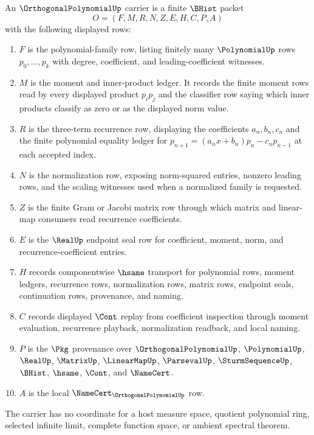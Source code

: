 \begin{definition}
\label{def:orthogonal-polynomial-carrier}
An $\OrthogonalPolynomialUp$ carrier is a finite $\BHist$ packet
$$
O=(F,M,R,N,Z,E,H,C,P,A)
$$
with the following displayed rows:
\begin{enumerate}
\item $F$ is the polynomial-family row, listing finitely many $\PolynomialUp$ rows $p_0,\ldots,p_k$ with degree, coefficient, and leading-coefficient witnesses.
\item $M$ is the moment and inner-product ledger. It records the finite moment rows read by every displayed product $p_i p_j$ and the classifier row saying which inner products classify as zero or as the displayed norm value.
\item $R$ is the three-term recurrence row, displaying the coefficients $a_n,b_n,c_n$ and the finite polynomial equality ledger for $p_{n+1}=(a_n x+b_n)p_n-c_n p_{n-1}$ at each accepted index.
\item $N$ is the normalization row, exposing norm-squared entries, nonzero leading rows, and the scaling witnesses used when a normalized family is requested.
\item $Z$ is the finite Gram or Jacobi matrix row through which matrix and linear-map consumers read recurrence coefficients.
\item $E$ is the $\RealUp$ endpoint seal row for coefficient, moment, norm, and recurrence-coefficient entries.
\item $H$ records componentwise $\hsame$ transport for polynomial rows, moment ledgers, recurrence rows, normalization rows, matrix rows, endpoint seals, continuation rows, provenance, and naming.
\item $C$ records displayed $\Cont$ replay from coefficient inspection through moment evaluation, recurrence playback, normalization readback, and local naming.
\item $P$ is the $\Pkg$ provenance over $\OrthogonalPolynomialUp$, $\PolynomialUp$, $\RealUp$, $\MatrixUp$, $\LinearMapUp$, $\ParsevalUp$, $\SturmSequenceUp$, $\BHist$, $\hsame$, $\Cont$, and $\NameCert$.
\item $A$ is the local $\NameCert_{\OrthogonalPolynomialUp}$ row.
\end{enumerate}
The carrier has no coordinate for a host measure space, quotient polynomial ring, selected infinite limit, complete function space, or ambient spectral theorem.
\end{definition}

